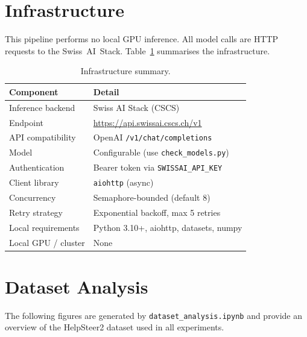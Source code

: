 \documentclass[11pt,a4paper]{article}
\begin{document}
\section{Infrastructure}\label{sec:infra}

This pipeline performs no local GPU inference. All model calls are HTTP
requests to the Swiss~AI~Stack. Table~\ref{tab:infra} summarises the
infrastructure.

\begin{table}[htbp]
\centering
\small
\caption{Infrastructure summary.}
\label{tab:infra}
\begin{tabular}{@{}ll@{}}
  \toprule
  \textbf{Component} & \textbf{Detail} \\
  \midrule
  Inference backend & Swiss AI Stack (CSCS) \\
  Endpoint & \url{https://api.swissai.cscs.ch/v1} \\
  API compatibility & OpenAI \texttt{/v1/chat/completions} \\
  Model & Configurable (use \texttt{check\_models.py}) \\
  Authentication & Bearer token via \texttt{SWISSAI\_API\_KEY} \\
  Client library & \texttt{aiohttp} (async) \\
  Concurrency & Semaphore-bounded (default 8) \\
  Retry strategy & Exponential backoff, max 5 retries \\
  Local requirements & Python 3.10+, aiohttp, datasets, numpy \\
  Local GPU / cluster & None \\
  \bottomrule
\end{tabular}
\end{table}


\newpage
\section{Dataset Analysis}\label{sec:analysis}

The following figures are generated by \texttt{dataset\_analysis.ipynb} and
provide an overview of the HelpSteer2 dataset used in all experiments.
\end{document}
